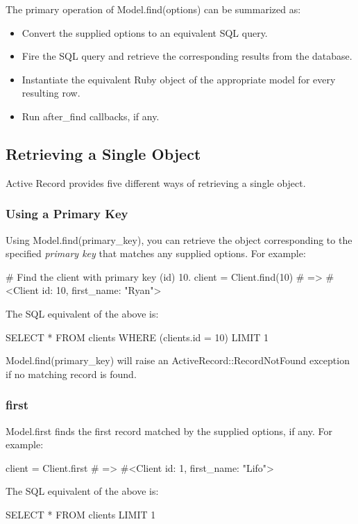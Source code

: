\documentclass[10pt]{book}
\newenvironment{code}{%
  \scriptsize
    \verbatim
}{%
    \endverbatim
    \newline
}
\begin{document}
The primary operation of Model.find(options) can be summarized as:
\begin{itemize}
	\item Convert the supplied options to an equivalent SQL query.
	\item Fire the SQL query and retrieve the corresponding results from the database.
	\item Instantiate the equivalent Ruby object of the appropriate model for every resulting row.
	\item Run after\_find callbacks, if any.
\end{itemize}

\subsection{ Retrieving a Single Object}

Active Record provides five different ways of retrieving a single object.

\subsubsection{ Using a Primary Key}

Using Model.find(primary\_key), you can retrieve the object corresponding to the specified \emph{primary key} that matches any supplied options. For example:
\begin{code}
# Find the client with primary key (id) 10.
client = Client.find(10)
# => #<Client id: 10, first_name: "Ryan">
\end{code}


The SQL equivalent of the above is:
\begin{code}
SELECT * FROM clients WHERE (clients.id = 10) LIMIT 1
\end{code}

Model.find(primary\_key) will raise an ActiveRecord::RecordNotFound exception if no matching record is found.

\subsubsection{ first}

Model.first finds the first record matched by the supplied options, if any. For example:
\begin{code}
client = Client.first
# => #<Client id: 1, first_name: "Lifo">
\end{code}

The SQL equivalent of the above is:
\begin{code}
SELECT * FROM clients LIMIT 1
\end{code}
\end{document}
